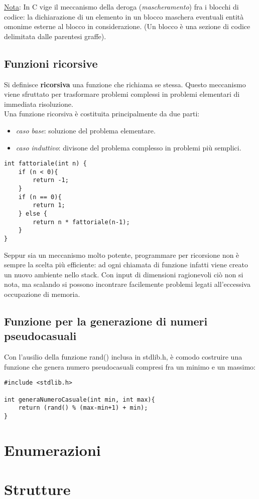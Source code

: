 \underline{Nota}: In C vige il meccanismo della deroga (\textit{mascheramento}) fra i blocchi di codice: la dichiarazione di un elemento in un blocco maschera eventuali entità omonime esterne al blocco in considerazione. (Un blocco è una sezione di codice delimitata dalle parentesi graffe).

\subsection{Funzioni ricorsive}
Si definisce \textbf{ricorsiva} una funzione che richiama se stessa. Questo meccanismo viene sfruttato per trasformare problemi complessi in problemi elementari di immediata risoluzione.\\
Una funzione ricorsiva è costituita principalmente da due parti:
\begin{itemize}[noitemsep]
	\item \textit{caso base}: soluzione del problema elementare.
	\item \textit{caso induttivo}: divisone del problema complesso in problemi più semplici.
\end{itemize}

\begin{lstlisting}[title={Calcolo del fattoriale di un numero implementato ricorsivamente}]
int fattoriale(int n) {
    if (n < 0){
        return -1;
    }
    if (n == 0){
        return 1;
    } else {
        return n * fattoriale(n-1);
    }
}
\end{lstlisting}
Seppur sia un meccanismo molto potente, programmare per ricorsione non è sempre la scelta più efficiente: ad ogni chiamata di funzione infatti viene creato un nuovo ambiente nello stack. Con input di dimensioni ragionevoli ciò non si nota, ma scalando si possono incontrare facilemente problemi legati all'eccessiva occupazione di memoria.

\subsection{Funzione per la generazione di numeri pseudocasuali}
Con l'ausilio della funzione \colorbox{light-gray}{rand()} inclusa in \colorbox{light-gray}{stdlib.h}, è comodo costruire una funzione che genera numero pseudocasuali compresi fra un minimo e un massimo:
\begin{lstlisting}[title={Funzione per la generazione di numeri pseudocasuali}]
#include <stdlib.h>

int generaNumeroCasuale(int min, int max){
    return (rand() % (max-min+1) + min);
}
\end{lstlisting}

\section{Enumerazioni}

\section{Strutture}

